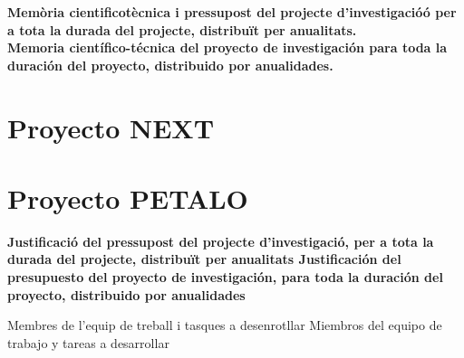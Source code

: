\documentclass[a4paper,11pt,oneside]{article}
\begin{document}
\newpage

%
%
%
{\bf
Mem\`oria cientificot\`ecnica i pressupost del projecte d’investigació\'o per a tota la durada del projecte, distribu\"it per anualitats. \\ Memoria cient\'ifico-t\'ecnica del proyecto de investigaci\'on para toda la duraci\'on del proyecto, distribuido por anualidades.
}


\section*{Proyecto NEXT}



\section*{Proyecto PETALO}



\newpage

{\bf
Justificació del pressupost del projecte d’investigació, per a tota la durada del projecte, distribuït per anualitats
Justificación del presupuesto del proyecto de investigación, para toda la duración del proyecto, distribuido por anualidades
}



Membres de l'equip de treball i tasques a desenrotllar 
Miembros del equipo de trabajo y tareas  a desarrollar 


\end{document}

